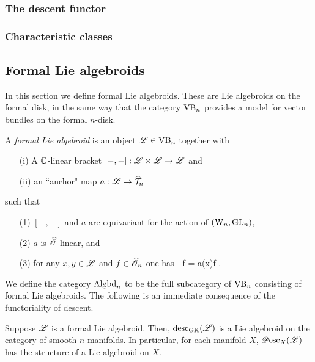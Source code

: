 \subsubsection{The descent functor}

\subsubsection{Characteristic classes}

\subsection{Formal Lie algebroids}

In this section we define formal Lie algebroids.
These are Lie algebroids on the formal disk, in the same way that the category ${\rm VB}_n$ provides a model for vector bundles on the formal $n$-disk. 

\begin{dfn} A {\em formal Lie algebroid} is an object $\mathscr L \in {\rm VB}_n$ together with
\begin{itemize}
\item[(i)] A $\mathbb C$-linear bracket $[-,-] : \mathscr L \times \mathscr L \to \mathscr L$ and
\item[(ii)] an ``anchor" map $a : \mathscr L \to \widehat{\mathcal T}_n$
\end{itemize}
such that 
\begin{itemize}
\item[(1)] $[-,-]$ and $a$ are equivariant for the action of $({{\rm W}_n}, {\rm GL}_n)$,
\item[(2)] $a$ is $\widehat{\mathscr O}$-linear, and
\item[(3)] for any $x,y\in \mathscr L$ and $f \in \widehat{\mathscr O}_n$ one has
\ben
[x, f \cdot y] -  f \cdot [x,y]  = a(x)\cdot f .
\een
\end{itemize}
\end{dfn}


We define the category ${\rm Algbd}_n$ to be the full subcategory of ${\rm VB}_n$ consisting of formal Lie algebroids.
The following is an immediate consequence of the functoriality of descent.
\begin{lem}
Suppose $\mathscr L$ is a formal Lie algebroid. 
Then, ${\rm desc}_{{\rm GK}}(\mathscr L)$ is a Lie algebroid on the category of smooth $n$-manifolds. 
In particular, for each manifold $X$, $\mathscr{D}{\rm esc}_X(\mathscr L)$ has the structure of a Lie algebroid on $X$.
\end{lem}

